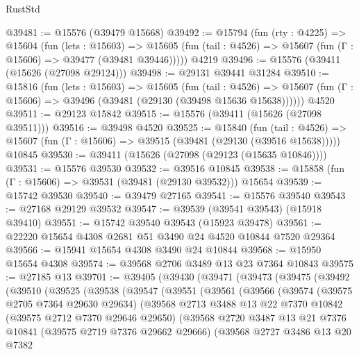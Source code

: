 \begin{lexlean}{RustStd}
\begin{coremodule}
@39481 := @15576 (@39479 @15668)
@39492 := @15794
    (fun (rty : @4225) =>
    @15604
      (fun (lets : @15603) =>
      @15605 (fun (tail : @4526) => @15607 (fun (Γ : @15606) => @39477 (@39481 @39446)))))
    @4219
@39496 := @15576 (@39411 (@15626 (@27098 @29124)))
@39498 := @29131 @39441 @31284
@39510 := @15816
    (fun (lets : @15603) =>
    @15605
      (fun (tail : @4526) =>
      @15607 (fun (Γ : @15606) => @39496 (@39481 (@29130 (@39498 @15636 @15638))))))
    @4520
@39511 := @29123 @15842
@39515 := @15576 (@39411 (@15626 (@27098 @39511)))
@39516 := @39498 @4520
@39525 := @15840
    (fun (tail : @4526) => @15607 (fun (Γ : @15606) => @39515 (@39481 (@29130 (@39516 @15638)))))
    @10845
@39530 := @39411 (@15626 (@27098 (@29123 (@15635 @10846))))
@39531 := @15576 @39530
@39532 := @39516 @10845
@39538 := @15858 (fun (Γ : @15606) => @39531 (@39481 (@29130 @39532))) @15654
@39539 := @15742 @39530
@39540 := @39479 @27165
@39541 := @15576 @39540
@39543 := @27168 @29129 @39532
@39547 := @39539 (@39541 @39543) (@15918 @39410)
@39551 := @15742 @39540 @39543 (@15923 @39478)
@39561 := @22220 @15654 @4308 @2681 @51 @3490 @24 @4520 @10844 @7520 @29364
@39566 := @15941 @15654 @4308 @3490 @24 @10844
@39568 := @15950 @15654 @4308
@39574 := @39568 @2706 @3489 @13 @23 @7364 @10843
@39575 := @27185 @13
@39701 := @39405
    (@39430
      (@39471
        (@39473
          (@39475
            (@39492
              (@39510
                (@39525
                  (@39538
                    (@39547
                      (@39551
                        (@39561
                          (@39566
                            (@39574
                              (@39575 @2705 @7364 @29630 @29634)
                              (@39568
                                @2713
                                @3488
                                @13
                                @22
                                @7370
                                @10842
                                (@39575 @2712 @7370 @29646 @29650)
                                (@39568
                                  @2720
                                  @3487
                                  @13
                                  @21
                                  @7376
                                  @10841
                                  (@39575 @2719 @7376 @29662 @29666)
                                  (@39568
                                    @2727
                                    @3486
                                    @13
                                    @20
                                    @7382

\end{coremodule}
\end{lexlean}
